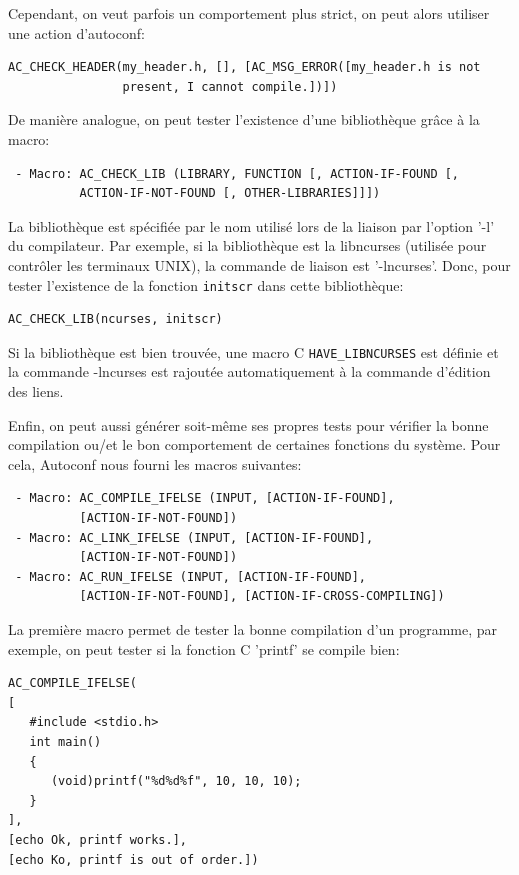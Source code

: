 \documentclass[11pt,a4paper]{article}
\begin{document}
Cependant, on veut parfois un comportement plus strict, on peut alors
utiliser une action d'autoconf:

{\small
\begin{verbatim}
AC_CHECK_HEADER(my_header.h, [], [AC_MSG_ERROR([my_header.h is not
                present, I cannot compile.])])
\end{verbatim}
}

De manière analogue, on peut tester l'existence d'une bibliothèque
grâce à la macro:
{\small
\begin{verbatim}
 - Macro: AC_CHECK_LIB (LIBRARY, FUNCTION [, ACTION-IF-FOUND [,
          ACTION-IF-NOT-FOUND [, OTHER-LIBRARIES]]])
\end{verbatim}
}

La bibliothèque est spécifiée par le nom utilisé lors de la liaison
par l'option '-l' du compilateur. Par exemple, si la bibliothèque est
la libncurses (utilisée pour contrôler les terminaux UNIX), la
commande de liaison est '-lncurses'. Donc, pour tester l'existence de
la fonction \texttt{initscr} dans cette bibliothèque:

{\small
\begin{verbatim}
AC_CHECK_LIB(ncurses, initscr)
\end{verbatim}
}

Si la bibliothèque est bien trouvée, une macro C
\texttt{HAVE\_LIBNCURSES} est définie et la commande -lncurses est
rajoutée automatiquement à la commande d'édition des liens.

Enfin, on peut aussi générer soit-même ses propres tests pour vérifier
la bonne compilation ou/et le bon comportement de certaines fonctions
du système. Pour cela, Autoconf nous fourni les macros suivantes:

{\small
\begin{verbatim}
 - Macro: AC_COMPILE_IFELSE (INPUT, [ACTION-IF-FOUND],
          [ACTION-IF-NOT-FOUND])
 - Macro: AC_LINK_IFELSE (INPUT, [ACTION-IF-FOUND],
          [ACTION-IF-NOT-FOUND])
 - Macro: AC_RUN_IFELSE (INPUT, [ACTION-IF-FOUND],
          [ACTION-IF-NOT-FOUND], [ACTION-IF-CROSS-COMPILING])
\end{verbatim}
}

La première macro permet de tester la bonne compilation d'un
programme, par exemple, on peut tester si la fonction C 'printf' se
compile bien:
{\small
\begin{verbatim}
AC_COMPILE_IFELSE(
[
   #include <stdio.h>
   int main()
   {
      (void)printf("%d%d%f", 10, 10, 10);
   }
],
[echo Ok, printf works.],
[echo Ko, printf is out of order.])
\end{verbatim}
}
\end{document}
